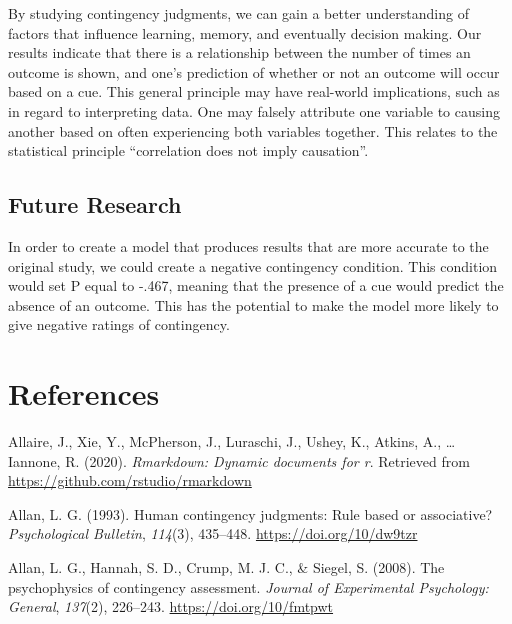 \documentclass[
  english,
  man,floatsintext]{apa6}
\begin{document}
By studying contingency judgments, we can gain a better understanding of factors that influence learning, memory, and eventually decision making. Our results indicate that there is a relationship between the number of times an outcome is shown, and one's prediction of whether or not an outcome will occur based on a cue. This general principle may have real-world implications, such as in regard to interpreting data. One may falsely attribute one variable to causing another based on often experiencing both variables together. This relates to the statistical principle \enquote{correlation does not imply causation}.

\hypertarget{future-research}{%
\subsection{Future Research}\label{future-research}}

In order to create a model that produces results that are more accurate to the original study, we could create a negative contingency condition. This condition would set P equal to -.467, meaning that the presence of a cue would predict the absence of an outcome. This has the potential to make the model more likely to give negative ratings of contingency.

\newpage

\hypertarget{references}{%
\section{References}\label{references}}

\begingroup
\setlength{\parindent}{-0.5in}
\setlength{\leftskip}{0.5in}

\hypertarget{refs}{}
\leavevmode\hypertarget{ref-R-rmarkdown}{}%
Allaire, J., Xie, Y., McPherson, J., Luraschi, J., Ushey, K., Atkins, A., \ldots{} Iannone, R. (2020). \emph{Rmarkdown: Dynamic documents for r}. Retrieved from \url{https://github.com/rstudio/rmarkdown}

\leavevmode\hypertarget{ref-allanHumanContingencyJudgments1993}{}%
Allan, L. G. (1993). Human contingency judgments: Rule based or associative? \emph{Psychological Bulletin}, \emph{114}(3), 435--448. \url{https://doi.org/10/dw9tzr}

\leavevmode\hypertarget{ref-allanPsychophysicsContingencyAssessment2008}{}%
Allan, L. G., Hannah, S. D., Crump, M. J. C., \& Siegel, S. (2008). The psychophysics of contingency assessment. \emph{Journal of Experimental Psychology: General}, \emph{137}(2), 226--243. \url{https://doi.org/10/fmtpwt}
\end{document}

